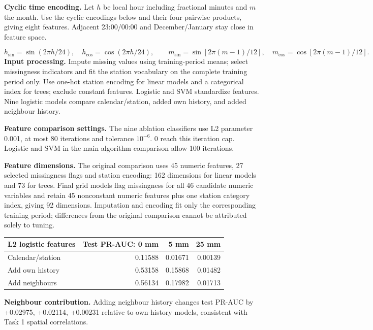 \documentclass[UTF8,fontset=fandol,10pt,a4paper,landscape]{ctexart}
\begin{document}
\textbf{Cyclic time encoding.} Let $h$ be local hour including fractional minutes and $m$ the month. Use the cyclic encodings below and their four pairwise products, giving eight features. Adjacent 23:00/00:00 and December/January stay close in feature space.

\[h_{\sin}=\sin(2\pi h/24),\quad h_{\cos}=\cos(2\pi h/24),\qquad m_{\sin}=\sin[2\pi(m-1)/12],\quad m_{\cos}=\cos[2\pi(m-1)/12].\]
\textbf{Input processing.} Impute missing values using training-period means; select missingness indicators and fit the station vocabulary on the complete training period only. Use one-hot station encoding for linear models and a categorical index for trees; exclude constant features. Logistic and SVM standardize features. Nine logistic models compare calendar/station, added own history, and added neighbour history.

\textbf{Feature comparison settings.} The nine ablation classifiers use L2 parameter 0.001, at most 80 iterations and tolerance $10^{-6}$. 0 reach this iteration cap. Logistic and SVM in the main algorithm comparison allow 100 iterations.

\textbf{Feature dimensions.} The original comparison uses 45 numeric features, 27 selected missingness flags and station encoding: 162 dimensions for linear models and 73 for trees. Final grid models flag missingness for all 46 candidate numeric variables and retain 45 nonconstant numeric features plus one station category index, giving 92 dimensions. Imputation and encoding fit only the corresponding training period; differences from the original comparison cannot be attributed solely to tuning.

\begin{center}\begin{tabular}{lrrr}\toprule
L2 logistic features & Test PR-AUC: 0 mm & 5 mm & 25 mm\\\midrule
Calendar/station & 0.11588 & 0.01671 & 0.00139\\
Add own history & 0.53158 & 0.15868 & 0.01482\\
Add neighbours & 0.56134 & 0.17982 & 0.01713\\
\bottomrule\end{tabular}\end{center}

\textbf{Neighbour contribution.} Adding neighbour history changes test PR-AUC by +0.02975, +0.02114, +0.00231 relative to own-history models, consistent with Task 1 spatial correlations.
\end{document}
